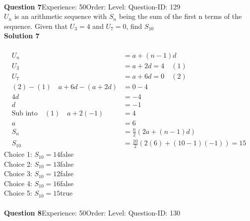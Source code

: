 \documentclass{article}
\begin{document}
\\[4pt]
\noindent\textbf{Question 7}\hspace{20pt}Experience: 50\hspace{20pt}Order: \hspace{20pt}Level: \hspace{20pt}Question-ID: 129\\[2pt]
$U_n$ is an arithmetic sequence with $S_n$ being the sum of the first n terms of the sequence. Given that $U_{3}=4$ and $U_{7}=0$, find $S_{10}$\\[4pt]
\noindent\textbf{Solution 7}\\[2pt]
\\[-35pt]\begin{align*}
U_n&=a+(n-1)d\\[2pt]
U_3&=a+2d=4 \quad (1)\\[2pt]
U_7&=a+6d=0 \quad (2)\\[2pt]
(2)-(1) \quad a+6d-(a+2d)&=0-4\\[2pt]
4d&=-4\\[2pt]
d&=-1\\[2pt]
\text{Sub into}\quad (1) \quad a+2(-1)&=4\\[2pt]
a&=6\\[12pt]
S_n&=\displaystyle\frac{n}{2}(2a+(n-1)d)\\[2pt]
S_{10}&=\displaystyle\frac{10}{2}(2(6)+(10-1)(-1))=15
\end{align*}
Choice 1: \hspace{20pt}$S_{10}=14$\hspace{20pt}false\\
Choice 2: \hspace{20pt}$S_{10}=13$\hspace{20pt}false\\
Choice 3: \hspace{20pt}$S_{10}=12$\hspace{20pt}false\\
Choice 4: \hspace{20pt}$S_{10}=16$\hspace{20pt}false\\
Choice 5: \hspace{20pt}$S_{10}=15$\hspace{20pt}true\\
\\[4pt]
\noindent\textbf{Question 8}\hspace{20pt}Experience: 50\hspace{20pt}Order: \hspace{20pt}Level: \hspace{20pt}Question-ID: 130\\[2pt]
\end{document}
